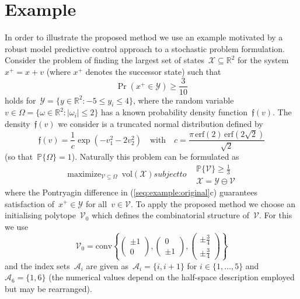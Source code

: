 \documentclass[letterpaper, 10pt, conference]{ieeeconf} %
\providecommand{\abs}[1]{\left\lvert#1\right\rvert}
\providecommand{\conv}{\text{conv}}
\DeclareMathOperator*{\maximize}{maximize}
\begin{document}
\section{Example}\label{sec:example}
%
%
\noindent In order to illustrate the proposed method we use an example motivated by a robust model predictive control approach to a stochastic problem formulation.
%
Consider the problem of finding the largest set of states~$\mathcal X\subseteq\mathbb R^2$ for the system~$x^+=x+v$ (where $x^+$ denotes the successor state) such that
\[
\Pr (x^+\in\mathcal Y) \geq \frac{3}{10}
\]
holds for~$\mathcal Y = \{y\in\mathbb R^2:-5\leq y_i\leq 4\}$, where the random variable~$v\in\Omega=\{\omega\in\mathbb R^2:\abs{\omega_i}\leq2\}$ has a known probability density function~$\mathfrak f(v)$.
%
The density~$\mathfrak f(v)$ we consider is a truncated normal distribution defined by
\[
\mathfrak f(v) = \frac{1}{c}\exp(-v_1^2-2v_2^2)
\quad \text{with} \quad
c=\frac{\pi\,\text{erf}(2)\,\text{erf}(2\sqrt{2})}{\sqrt 2}
\]
(so that~$\mathbb P\{\Omega\}=1$).
%
Naturally this problem can be formulated as
%
\begin{subequations}\label{seq:example:original}
\begin{equation}
	\maximize_{\mathcal V \subseteq\Omega} \ \text{vol}(\mathcal X)
\end{equation}
subject to
\begin{align}
	&\mathbb P\{\mathcal V\}\geq \frac{1}{3} \\
	&\mathcal X = \mathcal Y\ominus \mathcal V
\end{align}
\end{subequations}
%
where the Pontryagin difference in (\ref{seq:example:original}c) guarantees satisfaction of~$x^+\in\mathcal Y$ for all~$v\in\mathcal V$.
%
To apply the proposed method we choose an initialising polytope~$\mathcal V_0$ which defines the combinatorial structure of~$\mathcal V$. For this we use 
%
\[
\mathcal V_0 = \conv\left\{\begin{pmatrix}\pm 1\\0 \end{pmatrix},\begin{pmatrix}0\\\pm1\end{pmatrix},\begin{pmatrix}\pm\frac{3}{4}\\\pm\frac{3}{4}\end{pmatrix}\right\} 
\]
%
and the index sets~$\mathcal A_i$ are given as~$\mathcal A_i=\{i,i+1\}$ for $i\in\{1,\dots,5\}$ and~$\mathcal A_6=\{1,6\}$ (the numerical values depend on the half-space description employed but may be rearranged).
%
\end{document}
